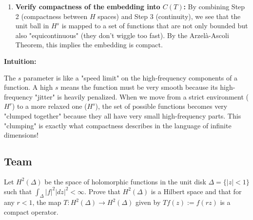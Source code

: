 \begin{solution}
\begin{enumerate}
    \item \textbf{Verify compactness of the embedding into $C(T)$:}
        By combining Step 2 (compactness between $H$ spaces) and Step 3 (continuity), we see that the unit ball in $H^s$ is mapped to a set of functions that are not only bounded but also "equicontinuous" (they don't wiggle too fast). By the Arzelà-Ascoli Theorem, this implies the embedding is compact.
\end{enumerate}


\textbf{Intuition:}

The $s$ parameter is like a "speed limit" on the high-frequency components of a function. A high $s$ means the function must be very smooth because its high-frequency "jitter" is heavily penalized. When we move from a strict environment ($H^r$) to a more relaxed one ($H^s$), the set of possible functions becomes very "clumped together" because they all have very small high-frequency parts. This "clumping" is exactly what compactness describes in the language of infinite dimensions!
\end{solution}

\vspace{2em}

\subsection{Team}

\begin{exercise}
\label{analysis:2011:7}
Let $H^2(\Delta)$ be the space of holomorphic functions in the unit disk $\Delta=\{|z|<1\}$ such that $\int_{\Delta}|f|^2|dz|^2 < \infty$. Prove that $H^2(\Delta)$ is a Hilbert space and that for any $r<1$, the map $T:H^2(\Delta)\to H^2(\Delta)$ given by $Tf(z):=f(rz)$ is a compact operator.
\end{exercise}

